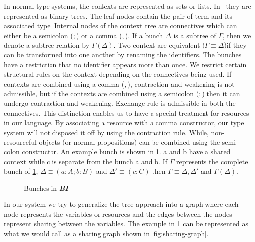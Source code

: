 In normal type systems, the contexts are represented as sets or lists. In \BI\ they are represented as binary trees.
The leaf nodes contain the pair of term and its associated type. Internal nodes of the context tree are
connectives which can either be a semicolon ($;$) or a comma ($,$).
If a bunch $\Delta$ is a subtree of $\Gamma$, then we denote a subtree relation by $\Gamma(\Delta)$.
Two context are equivalent ($\Gamma \equiv \Delta$)if they can be transformed into one another by renaming the identifiers.
The bunches have a restriction that no identifier appears more than once. We restrict certain structural rules on the context
depending on the connectives being used. If contexts are combined using a comma ($,$), contraction and weakening is not admissible,
but if the contexts are combined using a semicolon ($;$) then it can undergo contraction and weakening. Exchange rule is admissible
in both the connectives. This distinction enables us to have a special treatment for resources in our language.
By associating a resource with a comma constructor, our type system will not disposed it off by using the contraction rule.
While, non-resourceful objects (or normal propositions) can be combined using the semi-colon constructor.
An example bunch is shown in \cref{fig:bunches-bi}. a and b have a shared context while c is separate from the bunch a and b.
If $\Gamma$ represents the complete bunch of \cref{fig:bunches-bi}, $\Delta \equiv (a:A; b:B)$ and $\Delta' \equiv (c:C)$
then $\Gamma \equiv \Delta,\Delta'$ and $\Gamma(\Delta)$.

\begin{figure}[h]
  \centering
\caption{Bunches in \textbf{\em BI}}
\label{fig:bunches-bi}
\end{figure}

In our system we try to generalize the tree approach into a graph where each node represents the variables or resources
and the edges between the nodes represent sharing between the variables. The example in \cref{fig:bunches-bi} can
be represented as what we would call as a sharing graph shown in \cref{fig:sharing-graph}.


